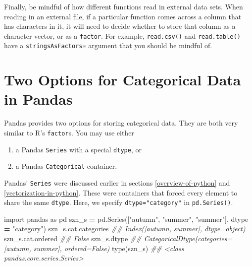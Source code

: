 \documentclass[
  12pt,
  krantz2]{krantz}
\makeatletter
\newenvironment{Shaded}{\begin{snugshade}}{\end{snugshade}}
\newcommand{\BuiltInTok}[1]{#1}
\newcommand{\CommentTok}[1]{\textcolor[rgb]{0.37,0.37,0.37}{\textit{#1}}}
\newcommand{\ImportTok}[1]{#1}
\newcommand{\NormalTok}[1]{#1}
\newcommand{\OperatorTok}[1]{\textcolor[rgb]{0.43,0.43,0.43}{\textbf{#1}}}
\newcommand{\StringTok}[1]{\textcolor[rgb]{0.5,0.5,0.5}{#1}}
\providecommand{\tightlist}{%
  \setlength{\itemsep}{0pt}\setlength{\parskip}{0pt}}
\newenvironment{kframe}{%
\medskip{}
\setlength{\fboxsep}{.8em}
 \def\at@end@of@kframe{}%
 \ifinner\ifhmode%
  \def\at@end@of@kframe{\end{minipage}}%
  \begin{minipage}{\columnwidth}%
 \fi\fi%
 \def\FrameCommand##1{\hskip\@totalleftmargin \hskip-\fboxsep
 \colorbox{shadecolor}{##1}\hskip-\fboxsep
     \hskip-\linewidth \hskip-\@totalleftmargin \hskip\columnwidth}%
 \MakeFramed {\advance\hsize-\width
   \@totalleftmargin\z@ \linewidth\hsize
   \@setminipage}}%
 {\par\unskip\endMakeFramed%
 \at@end@of@kframe}
\renewenvironment{Shaded}{\begin{kframe}}{\end{kframe}}
\makeatother
\begin{document}
Finally, be mindful of how different functions read in external data sets. When reading in an external file, if a particular function comes across a column that has characters in it, it will need to decide whether to store that column as a character vector, or as a \texttt{factor}. For example, \texttt{read.csv()} and \texttt{read.table()} have a \texttt{stringsAsFactors=} argument that you should be mindful of.

\hypertarget{two-options-for-categorical-data-in-pandas}{%
\section{Two Options for Categorical Data in Pandas}\label{two-options-for-categorical-data-in-pandas}}

Pandas provides two options for storing categorical data. They are both very similar to R's \texttt{factor}s. You may use either

\begin{enumerate}
\def\labelenumi{\arabic{enumi}.}
\tightlist
\item
  a Pandas \texttt{Series} with a special \texttt{dtype}, or
\item
  a Pandas \texttt{Categorical} container.
\end{enumerate}

Pandas' \texttt{Series} were discussed earlier in sections \ref{overview-of-python} and \ref{vectorization-in-python}. These were containers that forced every element to share the same \texttt{dtype}. Here, we specify \texttt{dtype="category"} in \texttt{pd.Series()}.

\begin{Shaded}
\begin{Highlighting}[]
\ImportTok{import}\NormalTok{ pandas }\ImportTok{as}\NormalTok{ pd}
\NormalTok{szn\_s }\OperatorTok{=}\NormalTok{ pd.Series([}\StringTok{"autumn"}\NormalTok{, }\StringTok{"summer"}\NormalTok{, }\StringTok{"summer"}\NormalTok{], dtype }\OperatorTok{=} \StringTok{"category"}\NormalTok{) }
\NormalTok{szn\_s.cat.categories}
\CommentTok{\#\# Index([\textquotesingle{}autumn\textquotesingle{}, \textquotesingle{}summer\textquotesingle{}], dtype=\textquotesingle{}object\textquotesingle{})}
\NormalTok{szn\_s.cat.ordered}
\CommentTok{\#\# False}
\NormalTok{szn\_s.dtype}
\CommentTok{\#\# CategoricalDtype(categories=[\textquotesingle{}autumn\textquotesingle{}, \textquotesingle{}summer\textquotesingle{}], ordered=False)}
\BuiltInTok{type}\NormalTok{(szn\_s)}
\CommentTok{\#\# \textless{}class \textquotesingle{}pandas.core.series.Series\textquotesingle{}\textgreater{}}
\end{Highlighting}
\end{Shaded}
\end{document}

